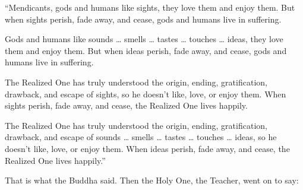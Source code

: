 \documentclass[12pt,openany]{book}%
\begin{document}
“Mendicants, gods and humans like sights, they love them and enjoy them. But when sights perish, fade away, and cease, gods and humans live in suffering. 

Gods and humans like sounds … smells … tastes … touches … ideas, they love them and enjoy them. But when ideas perish, fade away, and cease, gods and humans live in suffering. 

The Realized One has truly understood the origin, ending, gratification, drawback, and escape of sights, so he doesn’t like, love, or enjoy them. When sights perish, fade away, and cease, the Realized One lives happily. 

The Realized One has truly understood the origin, ending, gratification, drawback, and escape of sounds … smells … tastes … touches … ideas, so he doesn’t like, love, or enjoy them. When ideas perish, fade away, and cease, the Realized One lives happily.” 

That is what the Buddha said. Then the Holy One, the Teacher, went on to say: 
\end{document}

